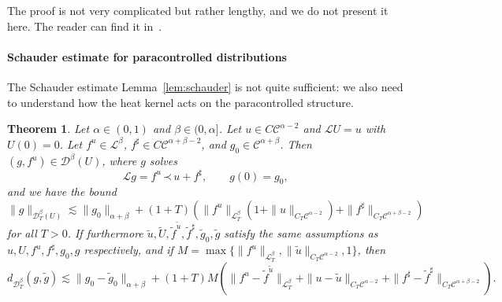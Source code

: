 \documentclass[a4paper,11pt]{article}
\newtheorem{theorem}{Theorem}
\newcommand{\LL}{\mathscr{L}}
\newcommand{\CC}{\mathscr{C}}
\newcommand{\CD}{\mathscr{D}}
\newcommand{\DD}{\mathscr{D}}
\newcommand{\lpara}{\,\mathord{\prec}\,}
\begin{document}
The proof is not very complicated but rather lengthy, and we do not present it
here. The reader can find it in~\cite{Gubinelli2012}.

\paragraph{Schauder estimate for paracontrolled distributions}The Schauder
estimate Lemma~\ref{lem:schauder} is not quite sufficient: we also need to
understand how the heat kernel acts on the paracontrolled structure.

\begin{theorem}\label{thm:schauder paracontrolled}Let $\alpha \in (0, 1)$ and $\beta \in
  (0, \alpha]$. Let $u \in C \CC^{\alpha - 2}$ and $\LL U = u$ with $U (0) =
  0$. Let $f^u \in \LL^{\beta}$, $f^{\sharp} \in C \CC^{\alpha + \beta - 2}$,
  and $g_0 \in \CC^{\alpha + \beta}$. Then $(g, f^u) \in \CD^{\beta} (U)$,
  where $g$ solves
  \[ \LL g = f^u \lpara u + f^{\sharp}, \hspace{2em} g (0) = g_0, \]
  and we have the bound
  \[ \| g \|_{\CD^{\beta}_T (U)} \lesssim \| g_0 \|_{\alpha + \beta} + (1 + T)
     (\| f^u \|_{\LL^{\beta}_T} (1 + \| u \|_{C_T \CC^{\alpha - 2}}) + \|
     f^{\sharp} \|_{C_T \CC^{\alpha + \beta - 2}}) \]
  for all $T > 0$. If furthermore $\tilde{u}, \tilde{U}, \tilde{f}^{\tilde u},
  \tilde{f}^{\sharp}, \tilde{g}_0, \tilde{g}$ satisfy the same assumptions as
  $u, U, f^u, f^{\sharp}, g_0, g$ respectively, and if $M = \max \{ \| f^u
  \|_{\LL^{\beta}_T}, \| \tilde{u} \|_{C_T \CC^{\alpha - 2}}, 1\}$, then
  \begin{equation*}
    d_{\DD^{\beta}_T} (g, \tilde{g}) \lesssim \| g_0 - \tilde{g}_0
    \|_{\alpha + \beta} 
     + (1 + T) M (\|f^u - \tilde{f}^{\tilde u} \|_{\LL^{\beta}_T} +\|u - \tilde{u}
    \|_{C_T \CC^{\alpha - 2}} +\|f^{\sharp} - \tilde{f}^{\sharp} \|_{C_T
    \CC^{\alpha + \beta - 2}}) . 
  \end{equation*}
\end{theorem}
\end{document}

